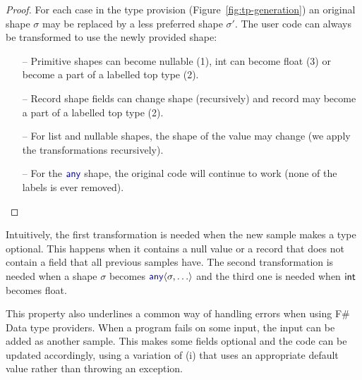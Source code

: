 \documentclass[10pt,nocopyrightspace]{sigplanconf}
\newcommand{\kvd}[1]{\textnormal{\textcolor{kvdclr}{\sffamily #1}}}
\newcommand{\ident}[1]{\textnormal{\sffamily #1}}
\begin{document}
\begin{proof}
For each case in the type provision (Figure~\ref{fig:tp-generation}) an original shape $\sigma$
may be replaced by a less preferred shape $\sigma'$. The user code can always be transformed
to use the newly provided shape:

\begin{itemize}
\item[--] Primitive shapes can become nullable (1), \ident{int} can become \ident{float} (3)
  or become a part of a labelled top type (2).
\item[--] Record shape fields can change shape (recursively) and record may become a part
  of a labelled top type (2).
\item[--] For list and nullable shapes, the shape of the value may change (we apply the
  transformations recursively).
\item[--] For the $\kvd{any}$ shape, the original code will continue to work (none of the labels is ever removed).
\end{itemize}
\vspace{-1.5em}
\end{proof}
%
\noindent
Intuitively, the first transformation is needed when the new sample makes a type optional.
This happens when it contains a \kvd{null} value or a record that does not contain a field
that all previous samples have. The second transformation is needed when a shape $\sigma$
becomes $\kvd{any}\langle\sigma, \ldots\rangle$ and the third one is needed when $\ident{int}$
becomes \ident{float}.

This property also underlines a common way of handling errors when using F\# Data type providers.
When a program fails on some input, the input can be added as another sample. This makes some
fields optional and the code can be updated accordingly, using a variation of (i) that uses
an appropriate default value rather than throwing an exception.



%
%
\end{document}
